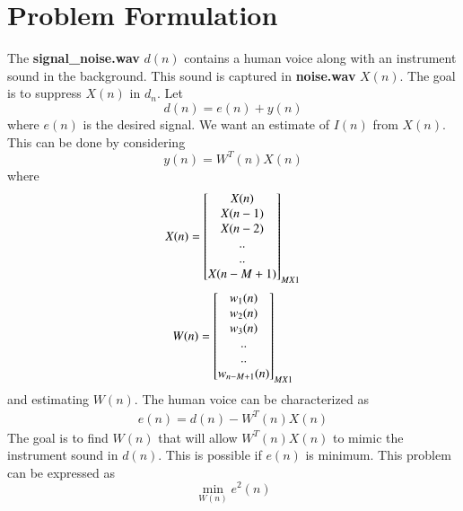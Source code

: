 \documentclass[journal,12pt,twocolumn]{IEEEtran}
\begin{document}
\section{Problem Formulation}
The \textbf{signal\_noise.wav} $d(n)$ contains a human voice along with an instrument sound in the background.  This sound
is captured in \textbf{noise.wav} $X(n)$. The goal is to suppress $X(n)$ in $d_n$.
%
Let
\begin{equation}
d(n) = e(n) + y(n)
\end{equation}
where $e(n)$ is the desired signal. We want an estimate of $I(n)$ from $X(n)$.  This can be done by considering
\begin{equation}
y(n) = W^{T}(n)X(n)
\end{equation}
where
\begin{align}
 X(n)
 =
  \begin{bmatrix}
   X(n) \\ X(n-1)\\
   X(n-2) \\ $..$ \\ $..$ \\ X(n-M+1)  \end{bmatrix}_{M X 1}
\end{align}
\begin{align}
 W(n)
 =
  \begin{bmatrix}
   w_1(n) \\ w_2(n)\\
   w_3(n) \\ $..$ \\ $..$ \\ w_{n-M+1}(n)  \end{bmatrix}_{M X 1}
\end{align}
and estimating $W(n)$.
The human voice can be characterized as
%
\begin{align}
\label{eq:error}
e(n) = d(n)-W^{T}(n)X(n)
\end{align}
%
The goal is to find $W(n)$ that will allow $W^{T}(n)X(n)$ to mimic the instrument sound in $d(n)$.
This is possible if $e(n)$ is minimum. This problem can be expressed as
\begin{equation}
\label{eq:prob_mse}
\min_{W(n)}e^{2}(n)
\end{equation}
%
\end{document}
